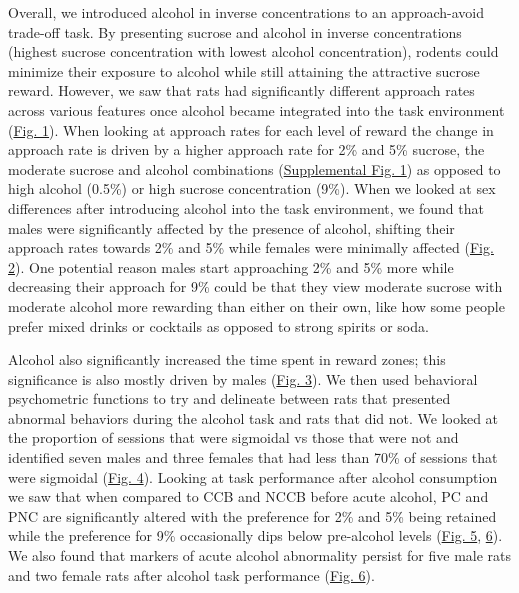 \documentclass{article}
\begin{document}
Overall, we introduced alcohol in inverse concentrations to an approach-avoid trade-off task. By presenting sucrose and alcohol in inverse concentrations (highest sucrose concentration with lowest alcohol concentration), rodents could minimize their exposure to alcohol while still attaining the attractive sucrose reward. However, we saw that rats had significantly different approach rates across various features once alcohol became integrated into the task environment (\hyperref[fig:alcohol_main_1]{Fig. 1}). When looking at approach rates for each level of reward the change in approach rate is driven by a higher approach rate for 2\% and 5\% sucrose, the moderate sucrose and alcohol combinations (\hyperref[fig:Alcohol_SI_1]{Supplemental Fig. 1}) as opposed to high alcohol (0.5\%) or high sucrose concentration (9\%). When we looked at sex differences after introducing alcohol into the task environment, we found that males were significantly affected by the presence of alcohol, shifting their approach rates towards 2\% and 5\% while females were minimally affected (\hyperref[fig:alcohol_main_2]{Fig. 2}). One potential reason males start approaching 2\% and 5\% more while decreasing their approach for 9\% could be that they view moderate sucrose with moderate alcohol more rewarding than either on their own, like how some people prefer mixed drinks or cocktails as opposed to strong spirits or soda.

\vspace{1em}

Alcohol also significantly increased the time spent in reward zones; this significance is also mostly driven by males (\hyperref[fig:alcohol_main_3]{Fig. 3}). We then used behavioral psychometric functions to try and delineate between rats that presented abnormal behaviors during the alcohol task and rats that did not. We looked at the proportion of sessions that were sigmoidal vs those that were not and identified seven males and three females that had less than 70\% of sessions that were sigmoidal (\hyperref[fig:alcohol_main_4]{Fig. 4}). Looking at task performance after alcohol consumption we saw that when compared to CCB and NCCB before acute alcohol, PC and PNC are significantly altered with the preference for 2\% and 5\% being retained while the preference for 9\% occasionally dips below pre-alcohol levels (\hyperref[fig:alcohol_main_5]{Fig. 5}, \hyperref[fig:alcohol_main_6]{6}). We also found that markers of acute alcohol abnormality persist for five male rats and two female rats after alcohol task performance (\hyperref[fig:alcohol_main_6]{Fig. 6}).
\end{document}
